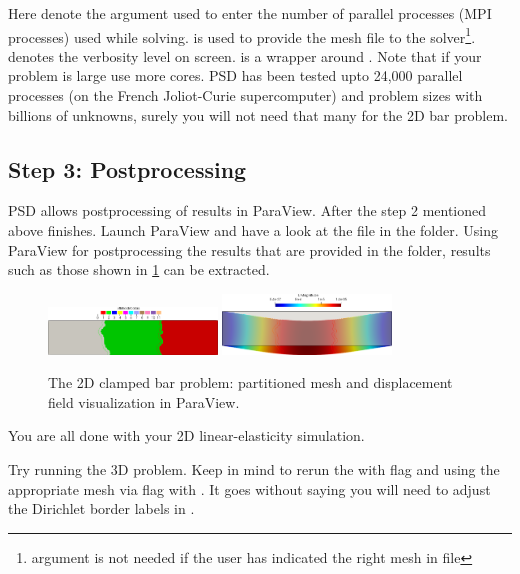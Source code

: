 Here  denote the argument used to enter the number of
parallel processes (MPI processes) used while solving.
 is used to provide the mesh file to
the
solver\footnote{  argument is not needed if the user has indicated the right mesh in  file}.
 denotes the verbosity level on screen. is a
wrapper around . Note that if your problem is large
use more cores. PSD has been tested upto 24,000 parallel processes (on
the French Joliot-Curie supercomputer) and problem sizes with billions
of unknowns, surely you will not need that many for the 2D bar problem.

\subsection{Step 3: Postprocessing}

PSD allows postprocessing of results in ParaView. After the step 2
mentioned above finishes. Launch ParaView and have a look at the
 file in the  folder. Using ParaView for
postprocessing the results that are provided in the 
folder, results such as those shown in \cref{bar-le-full-nnn} can be
extracted.

\begin{figure}[h!]
\centering
\includegraphics[align=t,width=0.4\textwidth]{./Images/le-2d-bar-partitioned3.png}\hfill
\includegraphics[align=t,width=0.4\textwidth]{./Images/le-2d-bar-clamped-ends.png}
\caption{The 2D clamped bar problem: partitioned mesh and displacement field visualization in ParaView. \label{bar-le-full-nnn}}
\end{figure}

You are all done with your 2D linear-elasticity simulation.

Try running the 3D problem. Keep in mind to rerun the
 with  flag and using the
appropriate mesh via  flag with . It goes
without saying you will need to adjust the Dirichlet border labels in
.

